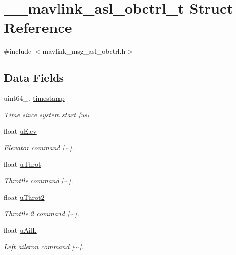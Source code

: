 \hypertarget{struct____mavlink__asl__obctrl__t}{\section{\+\_\+\+\_\+mavlink\+\_\+asl\+\_\+obctrl\+\_\+t Struct Reference}
\label{struct____mavlink__asl__obctrl__t}
}


{\ttfamily \#include $<$mavlink\+\_\+msg\+\_\+asl\+\_\+obctrl.\+h$>$}

\subsection*{Data Fields}
\begin{DoxyCompactItemize}
\item 
uint64\+\_\+t \hyperlink{struct____mavlink__asl__obctrl__t_a0626e4a249c6a27b041c655f75454186}{timestamp}
\begin{DoxyCompactList}\small\item\em Time since system start \mbox{[}us\mbox{]}. \end{DoxyCompactList}\item 
float \hyperlink{struct____mavlink__asl__obctrl__t_aec6c1bff8f21f99a19a0850b78a04b4b}{u\+Elev}
\begin{DoxyCompactList}\small\item\em Elevator command \mbox{[}$\sim$\mbox{]}. \end{DoxyCompactList}\item 
float \hyperlink{struct____mavlink__asl__obctrl__t_a4ba7bded13997fedbe0c0d5577e9818d}{u\+Throt}
\begin{DoxyCompactList}\small\item\em Throttle command \mbox{[}$\sim$\mbox{]}. \end{DoxyCompactList}\item 
float \hyperlink{struct____mavlink__asl__obctrl__t_a1f3327bb7b6b62c75ab82cf872563f87}{u\+Throt2}
\begin{DoxyCompactList}\small\item\em Throttle 2 command \mbox{[}$\sim$\mbox{]}. \end{DoxyCompactList}\item 
float \hyperlink{struct____mavlink__asl__obctrl__t_ad5520d4e6c2024ee5257383cee1fe4e6}{u\+Ail\+L}
\begin{DoxyCompactList}\small\item\em Left aileron command \mbox{[}$\sim$\mbox{]}. \end{DoxyCompactList}\item 

\end{DoxyCompactItemize}
